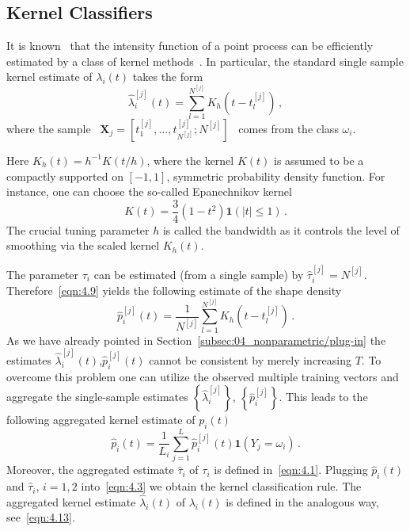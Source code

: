 \documentclass[lettersize,journal,onecolumn]{IEEEtran}
\theoremstyle{definition}
\newcommand{\indicator}[1]{{\mathbf{1}}\left( #1 \right)}
\begin{document}

\subsection{Kernel Classifiers}
\label{subsec:04_nonparametric/kernel}

\noindent It is known~\cite{andersen2012statistical, diggle1988equivalence} that the 
intensity function of a point process can be efficiently estimated by a class of kernel 
methods~\cite{wand1994kernel, grebpaw08}. In particular, the standard single sample  
kernel estimate of $\lambda_{i}(t)$ takes the form
\begin{equation}
	\widehat{\lambda}_{i}^{[j]}(t)=
	\sum_{l=1}^{N^{[j]}}K_{h}\left(t-t_{l}^{[j]}\right)
	\label{eqn:4.9}\,,
\end{equation}
where the sample \mbox{
	$\mathbf{X}_{j}=\left[t_{1}^{[j]},\ldots,t_{N^{[j]}}^{[j]};N^{[j]}\right]$
} comes from the class $\omega_{i}$. 

Here \mbox{$
	K_{h}(t) = h^{-1}K(t/h)
	$}, where the kernel $K(t)$ is assumed to be a compactly supported on $[-1,1]$, symmetric 
probability density function. For instance, one can choose the so-called
Epanechnikov kernel
\begin{equation*}
	K(t) = \frac{3}{4}\left(1-t^{2}\right)\indicator{|t|\leq1}
	\,.
\end{equation*}
The crucial tuning parameter $h$ is called the bandwidth as it controls the level of
smoothing via the scaled kernel $K_{h}(t)$.

The parameter $\tau_{i}$ can be estimated (from a single sample) by \mbox{$
	\widehat{\tau}_{i}^{[j]}=N^{[j]}
	$}. Therefore~\eqref{eqn:4.9} yields the following estimate of the shape density
\begin{equation*}
	\widehat{p}_{i}^{[j]}(t) = 
	\frac{1}{N^{[j]}} \sum_{l=1}^{N^{[j]}} K_{h}\left(t-t_{l}^{[j]}\right)
	\,.
\end{equation*}
As we have already pointed in Section~\ref{subsec:04_nonparametric/plug-in} the 
estimates $\widehat{\lambda}_{i}^{[j]}(t)$,\enspace $\widehat{p}_{i}^{[j]}(t)$ cannot be
consistent by merely increasing $T$. To overcome this problem one can utilize the
observed multiple training vectors and aggregate the single-sample estimates 
$\left\{\widehat{\lambda}_{i}^{[j]}\right\}$,\enspace 
$\left\{\widehat{p}_{i}^{[j]}\right\}$. This leads to the following aggregated kernel 
estimate of $p_{i}(t)$
\begin{equation}
	\widehat{p}_{i}(t) = 
	\frac{1}{L_i} 
	\sum_{j=1}^{L} \widehat{p}_{i}^{[j]}(t) \indicator{Y_{j}=\omega_{i}}
	\label{eqn:4.10}\,.
\end{equation}
Moreover, the aggregated estimate $\widehat{\tau}_{i}$ of $\tau_{i}$ is defined 
in~\eqref{eqn:4.1}. Plugging $\widehat{p}_{i}(t)$ and $\widehat{\tau}_{i}$, 
\enspace$i=1,2$ into~\eqref{eqn:4.3} we obtain the kernel classification rule. The 
aggregated kernel estimate $\widehat{\lambda}_{i}(t)$ of $\lambda_{i}(t)$ is defined in the 
analogous way, see~\eqref{eqn:4.13}.
\end{document}
